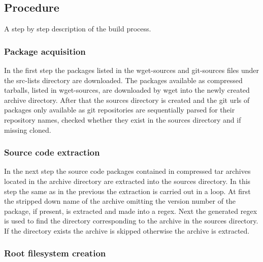 \subsection{Procedure}

A step by step description of the build process.

\subsubsection{Package acquisition}

In the first step the packages listed in the wget-sources and git-sources files under the src-lists directory are downloaded. The packages available as compressed tarballs, listed in wget-sources, are downloaded by wget into the newly created archive directory. After that the sources directory is created and the git \glspl{url} of packages only available as git repositories are sequentially parsed for their repository names, checked whether they exist in the sources directory and if missing cloned.


\subsubsection{Source code extraction}

In the next step the source code packages contained in compressed tar archives located in the archive directory are extracted into the sources directory. In this step the same as in the previous the extraction is carried out in a loop. At first the stripped down name of the archive omitting the version number of the package, if present, is extracted and made into a \gls{regex}. Next the generated \gls{regex} is used to find the directory corresponding to the archive in the sources directory. If the directory exists the archive is skipped otherwise the archive is extracted.


\subsubsection{Root filesystem creation}

